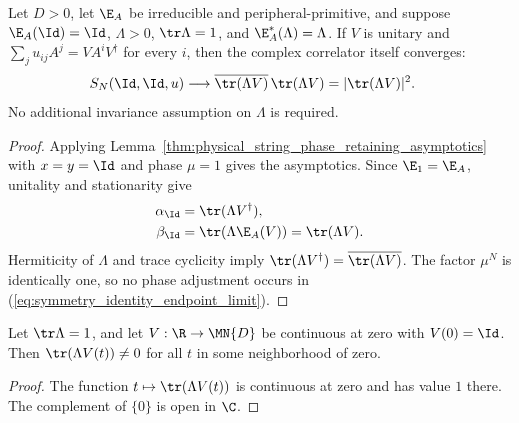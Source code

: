 \begin{lemma}
    \label{thm:identity_endpoint_complex_limit}
    \leanok
    Let $D>0$, let $\E_A$ be irreducible and peripheral-primitive, and
    suppose $\E_A(\Id)=\Id$, $\Lambda>0$, $\tr\Lambda=1$, and
    $\E_A^*(\Lambda)=\Lambda$.
    If $V$ is unitary and $\sum_j u_{ij}A^j=VA^iV^\dagger$ for every $i$,
    then the complex correlator itself converges:
    \begin{align}
        S_N(\Id,\Id,u)
         & \longrightarrow
        \overline{\tr(\Lambda V)}\,\tr(\Lambda V)
        =|\tr(\Lambda V)|^2.
        \label{eq:symmetry_identity_endpoint_limit}
    \end{align}
    No additional invariance assumption on $\Lambda$ is required.
\end{lemma}
\begin{proof}\leanok
    Applying Lemma~\ref{thm:physical_string_phase_retaining_asymptotics}
    with $x=y=\Id$ and phase $\mu=1$ gives the asymptotics. Since $\E_1=\E_A$,
    unitality and stationarity give
    \begin{align}
        \alpha_{\Id} & =\tr(\Lambda V^\dagger),\notag       \\
        \beta_{\Id}  & =\tr(\Lambda\E_A(V))=\tr(\Lambda V).
        \notag
    \end{align}
    Hermiticity of $\Lambda$ and trace cyclicity imply
    $\tr(\Lambda V^\dagger)=\overline{\tr(\Lambda V)}$.
    The factor $\mu^N$ is identically one, so no phase adjustment occurs
    in (\ref{eq:symmetry_identity_endpoint_limit}).
\end{proof}

\begin{lemma}
    \label{thm:virtual_path_trace_nonzero}
    \leanok
    Let $\tr\Lambda=1$, and let $V:\R\to\MN{D}$ be continuous at zero
    with $V(0)=\Id$. Then $\tr(\Lambda V(t))\ne0$ for all $t$ in
    some neighborhood of zero.
\end{lemma}
\begin{proof}\leanok
    The function $t\mapsto\tr(\Lambda V(t))$ is continuous at zero and
    has value $1$ there. The complement of $\{0\}$ is open in $\C$.
\end{proof}

